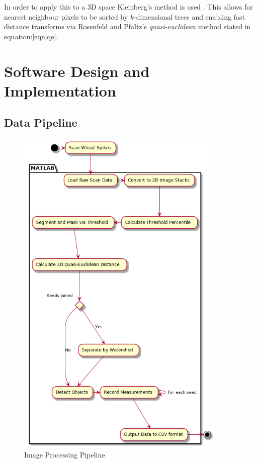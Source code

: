 \documentclass[11pt]{report}
\begin{document}
In order to apply this to a 3D space Kleinberg's method is used  \cite{Kleinberg1997}. This allows for nearest neighbour pixels to be sorted by $k$-dimensional trees
and enabling fast distance transforms via Rosenfeld and Pfaltz's \emph{quasi-euclidean} method stated in equation:\ref{eqn:qe}.

\chapter{Software Design and Implementation}
\label{sec-3}

\section{Data Pipeline}
\label{sec-3-1}

\begin{center}
\begin{figure}[htb]
\centering
\includegraphics[width=10cm]{./images/matlab.png}
\caption{\label{fig:matlab}Image Processing Pipeline}
\end{figure}
\end{center}
\end{document}
